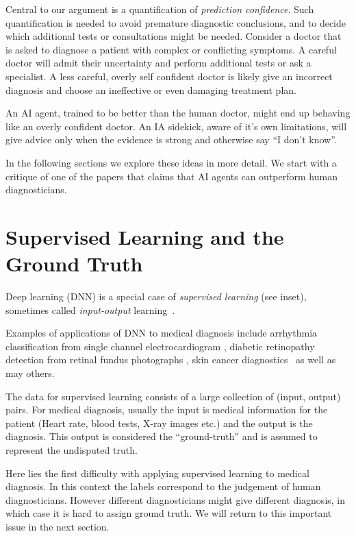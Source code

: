 \documentclass[11pt]{pnas-new}
\begin{document}
Central to our argument is a quantification of {\em prediction
  confidence}. Such quantification is needed to avoid premature
diagnostic conclusions, and to decide which additional tests or
consultations might be needed. Consider a doctor that is asked
to diagnose a patient with complex or conflicting symptoms. A careful
doctor will admit their uncertainty and perform additional tests or
ask a specialist. A less careful, overly self confident doctor is
likely give an incorrect diagnosis and choose an ineffective or even damaging
treatment plan.

An AI agent, trained to be better than the human doctor, might end up
behaving like an overly confident doctor. An IA sidekick, aware of
it's own limitations, will give advice only when the evidence is
strong and otherwise say ``I don't know''.

In the following sections we explore these ideas in more detail. We
start with a critique of one of the papers that claims that AI agents
can outperform human diagnosticians.

\section{Supervised Learning and the Ground Truth}
\label{sec:ground-truth}

Deep learning (DNN) is a special case of {\em supervised learning} (see
inset), sometimes called {\em input-output}
learning~\cite{ng2016artificial,topol2019deep}.

Examples of applications of DNN to medical diagnosis include arrhythmia classification 
from single channel electrocardiogram \cite{hannun2019cardiologist}, diabetic retinopathy detection from retinal fundus photographs \cite{gulshan2016development}, skin cancer diagnostics~\cite{esteva2017dermatologist} as well as may others.


The data for supervised learning consists of a large collection of
(input, output) pairs. For medical diagnosis, usually the input is medical
information for the patient (Heart rate, blood tests, X-ray images
etc.) and the output is the diagnosis. This output is considered the
``ground-truth'' and is assumed to represent the undisputed truth.

Here lies the first difficulty with applying supervised learning
to medical diagnosis. In this context the labels correspond to 
the judgement of human diagnosticians. However 
different diagnosticians might give different diagnosis, in which case it is hard to assign ground truth. 
We will return to this important issue in the next section.
\end{document}
